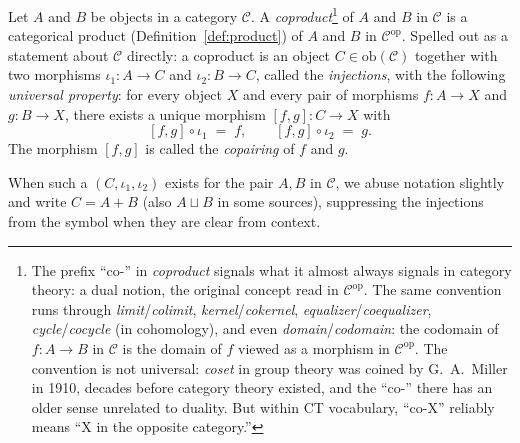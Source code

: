 \begin{definition}\label{def:coproduct}
Let $A$ and $B$ be objects in a category $\mathcal{C}$. A
\textit{coproduct}\footnote{The prefix
``co-'' in \textit{coproduct} signals what it almost always
signals in category theory: a dual notion, the original concept
read in $\mathcal{C}^{\mathrm{op}}$. The same convention runs
through \textit{limit}/\textit{colimit},
\textit{kernel}/\textit{cokernel},
\textit{equalizer}/\textit{coequalizer},
\textit{cycle}/\textit{cocycle} (in cohomology), and even
\textit{domain}/\textit{codomain}: the codomain of $f : A \to B$
in $\mathcal{C}$ is the domain of $f$ viewed as a morphism in
$\mathcal{C}^{\mathrm{op}}$. The convention is not universal:
\textit{coset} in group theory was coined by G.~A.~Miller in
1910, decades before category theory existed, and the ``co-''
there has an older sense unrelated to duality. But within CT
vocabulary, ``co-X'' reliably means ``X in the opposite
category.''} of $A$ and $B$ in $\mathcal{C}$ is a categorical
product (Definition~\ref{def:product}) of $A$ and $B$ in
$\mathcal{C}^{\mathrm{op}}$. Spelled out as a statement about
$\mathcal{C}$ directly: a coproduct is an object
$C \in \mathrm{ob}(\mathcal{C})$ together with two morphisms
$\iota_1 : A \to C$ and $\iota_2 : B \to C$, called the
\textit{injections}, with the
following \textit{universal property}: for every object $X$ and every pair of
morphisms $f : A \to X$ and $g : B \to X$, there exists a unique
morphism $[f, g] : C \to X$ with
\[ [f, g] \circ \iota_1 \; = \; f, \qquad
   [f, g] \circ \iota_2 \; = \; g. \]
The morphism $[f, g]$ is called the
\textit{copairing} of $f$ and $g$.

\begin{center}
\end{center}

\noindent When such a $(C, \iota_1, \iota_2)$ exists for the
pair $A, B$ in $\mathcal{C}$, we abuse notation slightly and
write $C = A + B$ (also $A \sqcup B$ in some sources),
suppressing the injections from the symbol when they are clear
from context.
\end{definition}


